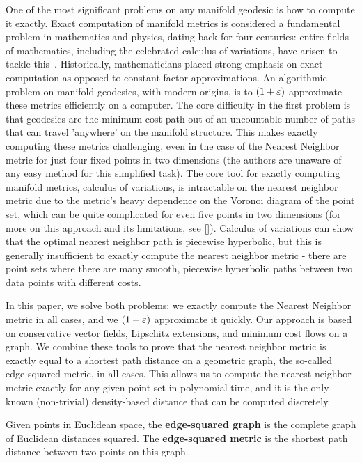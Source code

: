 One of the most significant problems on any manifold geodesic is how to
compute it exactly. Exact computation of manifold metrics is considered a
fundamental problem in mathematics and physics, dating back for four
centuries: entire fields of mathematics, including the celebrated calculus
of variations, have arisen to tackle this~\cite{}. Historically,
mathematicians placed strong emphasis on exact computation as opposed to
constant factor approximations. An algorithmic problem on manifold
geodesics, with modern origins, is to $(1+\varepsilon)$ approximate these metrics
efficiently on a computer. The core difficulty in the first problem is that
geodesics are the minimum cost path out of an uncountable number of paths
that can travel 'anywhere' on the manifold structure. This makes exactly
computing these metrics challenging, even in the case of the Nearest
Neighbor metric for just four fixed points in two dimensions (the authors
are unaware of any easy method for this simplified task). 
The core tool for exactly
computing manifold metrics, calculus of variations, is intractable on the
nearest neighbor metric due to the metric's heavy dependence on the Voronoi
diagram of the point set, which can be quite complicated for even five
points in two dimensions (for more on this approach and its limitations,
see []). Calculus of variations can show that the optimal nearest neighbor
path is piecewise hyperbolic, but this is generally insufficient to exactly
compute the nearest neighbor metric - there are point sets where there are
many smooth, piecewise hyperbolic paths between two data points with
different costs.


In this paper, we solve both problems: we exactly compute the Nearest
Neighbor metric in all cases, and we $(1+\varepsilon)$ approximate it quickly.
Our approach is
based on conservative vector fields, Lipschitz extensions, and minimum cost
flows on a graph. We combine these tools to prove that the nearest neighbor
metric is exactly equal to a shortest path distance on a geometric graph,
the so-called edge-squared metric, in all cases. This allows us to compute
the nearest-neighbor metric exactly for any given point set in polynomial
time, and it is the only known (non-trivial) density-based distance that can be computed
discretely.


\begin{definition} Given points in Euclidean space, the
\textbf{edge-squared graph} is the complete graph of Euclidean distances
squared. The \textbf{edge-squared metric} is the shortest path distance
between two points on this graph. \end{definition}

